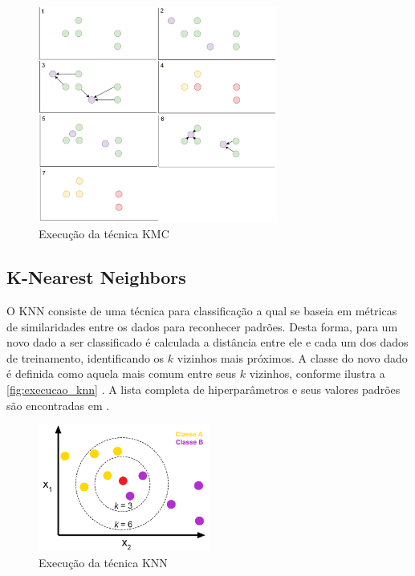 \begin{figure}[h]
  \centering
  \caption{Execução da técnica KMC}
   \label{fig:execucao_kcm}
   \includegraphics[width=0.7\textwidth]{figuras/fig_5.png}
\end{figure}

\subsection{K-Nearest Neighbors}

O KNN consiste de uma técnica para classificação a qual se baseia em métricas de similaridades entre os dados para reconhecer padrões. Desta forma, para um novo dado a ser classificado é calculada a distância entre ele e cada um dos dados de treinamento, identificando os $k$ vizinhos mais próximos. A classe do novo dado é definida como aquela mais comum entre seus $k$ vizinhos, conforme ilustra a \autoref{fig:execucao_knn} \cite{Khandelwal2018}.  A lista completa de hiperparâmetros e seus  valores padrões são encontradas em .

\begin{figure}[h]
  \centering
  \caption{Execução da técnica KNN}
   \label{fig:execucao_knn}
   \includegraphics[width=0.5\textwidth]{figuras/fig_6.png}
\end{figure}

